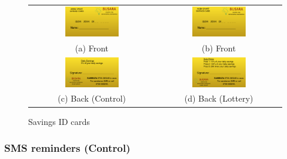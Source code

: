 \documentclass[11pt]{article}
\begin{document}
        \clearpage

        \begin{figure}[ht]
        \caption{Savings ID cards}
        \centering
        \begin{tabular}{cc}
        \includegraphics[width=0.45\textwidth]{../../figures/id_front_control.pdf} & \includegraphics[width=0.45\textwidth]{../../figures/id_front_lottery.pdf} \\
        (a) Front & (b) Front \\
        \includegraphics[width=0.45\textwidth]{../../figures/id_back_control.pdf} & \includegraphics[width=0.45\textwidth]{../../figures/id_back_lottery.pdf} \\
        (c) Back (Control) & (d) Back (Lottery) \\
        \end{tabular}
        \end{figure}

        \clearpage

        \subsubsection{SMS reminders (Control)}
\end{document}
